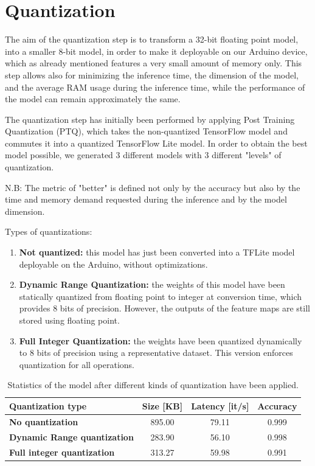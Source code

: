 \documentclass{Configuration_Files/PoliMi3i_thesis}
\begin{document}
\chapter{Quantization}
\label{ch:quantization}%
The aim of the quantization step is to transform a 32-bit floating point model, into a smaller 8-bit model, in order to make it deployable on our Arduino device, which as already mentioned features a very small amount of memory only. This step allows also for minimizing the inference time, the dimension of the model, and the average RAM usage during the inference time, while the performance of the model can remain approximately the same.

The quantization step has initially been performed by applying Post Training Quantization (PTQ), which takes the non-quantized TensorFlow model and commutes it into a quantized TensorFlow Lite model. In order to obtain the best model possible, we generated 3 different models with 3 different "levels" of quantization.

N.B: The metric of "better" is defined not only by the accuracy but also by the time and memory demand requested during the inference and by the model dimension.

Types of quantizations: 
\begin{enumerate}
    \item \textbf{Not quantized:} this model has just been converted into a TFLite model deployable on the Arduino, without optimizations.
    \item \textbf{Dynamic Range Quantization:} the weights of this model have been statically quantized from floating point to integer at conversion time, which provides 8 bits of precision. However, the outputs of the feature maps are still stored using floating point.
    \item \textbf{Full Integer Quantization:} the weights have been quantized dynamically to 8 bits of precision using a representative dataset. This version enforces quantization for all operations. 
\end{enumerate}
 
\begin{table}[H]
    \centering 
    \begin{tabular}{|p{15em} c c c |}
    \hline
    \rowcolor{bluepoli!40}
     \textbf{Quantization type} & \textbf{Size [KB]} & \textbf{Latency [it/s]} & \textbf{Accuracy} \T\B \\
    \hline \hline
    \textbf{No quantization} & 895.00 & 79.11 & 0.999 \T\B \\
    \textbf{Dynamic Range quantization} & 283.90 & 56.10 & 0.998\T\B\\
    \textbf{Full integer quantization} & 313.27 & 59.98 & 0.991 \B\\
    \hline
    \end{tabular}
    \\[10pt]
    \caption{Statistics of the model after different kinds of quantization have been applied.}
    \label{table:quantization_results}
\end{table}
\end{document}
